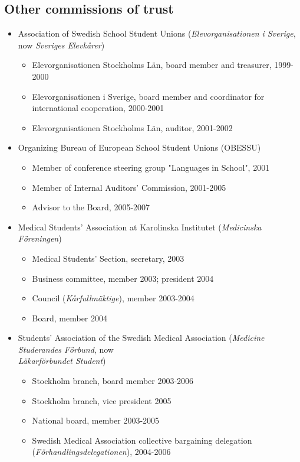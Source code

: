 \documentclass[10pt]{article}
\begin{document}
\subsection*{Other commissions of trust}
\begin{itemize}[nolistsep]
\item Association of Swedish School Student Unions (\emph{Elevorganisationen i Sverige}, now \emph{Sveriges Elevkårer})
	\begin{itemize}[nolistsep]
	\item Elevorganisationen Stockholms Län, board member and treasurer, 1999-2000
	\item Elevorganisationen i Sverige, board member and coordinator for international cooperation, 2000-2001
	\item Elevorganisationen Stockholms Län, auditor, 2001-2002
	\end{itemize}
\item Organizing Bureau of European School Student Unions (OBESSU)
	\begin{itemize}[nolistsep]
	\item Member of conference steering group "Languages in School", 2001
	\item Member of Internal Auditors' Commission, 2001-2005
	\item Advisor to the Board, 2005-2007
	\end{itemize}
\item Medical Students' Association at Karolinska Institutet (\emph{Medicinska Föreningen})
	\begin{itemize}[nolistsep]
	\item Medical Students' Section, secretary, 2003
	\item Business committee, member 2003; president 2004
	\item Council (\emph{Kårfullmäktige}), member 2003-2004
	\item Board, member 2004
	\end{itemize}
	\item Students' Association of the Swedish Medical Association (\emph{Medicine Studerandes Förbund}, now \\ \emph{Läkarförbundet Student})
	\begin{itemize}[nolistsep]
	\item Stockholm branch, board member 2003-2006
	\item Stockholm branch, vice president 2005
	\item National board, member 2003-2005
	\item Swedish Medical Association collective bargaining delegation (\emph{Förhandlingsdelegationen}), 2004-2006

\end{itemize}
\end{itemize}
\end{document}
